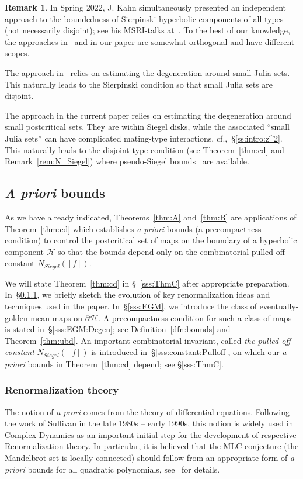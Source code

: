 \documentclass[11pt, reqno]{amsart}
\numberwithin{equation}{section}
\theoremstyle{plain}
\theoremstyle{theorem}
\theoremstyle{plain}
\theoremstyle{definition}
\newtheorem{rmk}[theorem]{Remark}
\numberwithin{figure}{section}
\begin{document}
\begin{rmk}
\label{rem:Khan:MSRI}
In Spring 2022, J. Kahn simultaneously presented an independent approach to the boundedness of Sierpinski hyperbolic components of all types (not necessarily disjoint); see his MSRI-talks at~\cite{Kah22}. To the best of our knowledge, the approaches in~\cite{Kah22} and in our paper are somewhat orthogonal and have different scopes. 


The approach in~\cite{Kah22} relies on estimating the degeneration around small Julia sets. This naturally leads to the Sierpinski condition so that small Julia sets are disjoint.

The approach in the current paper relies on estimating the degeneration around small postcritical sets. They are within Siegel disks, while the associated ``small Julia sets'' can have complicated mating-type interactions, cf.,~\S\ref{ss:intro:z^2}. This naturally leads to the disjoint-type condition (see Theorem~\ref{thm:cd} and Remark~\ref{rem:N_Siegel}) where pseudo-Siegel bounds~\cite{DL22,DLL25} are available.
\end{rmk}




\subsection{\emph{A priori} bounds}\label{ss:a priori bounds} As we have already indicated, Theorems~\ref{thm:A} and~\ref{thm:B} are applications of Theorem~\ref{thm:cd} which establishes \emph{a priori} bounds (a precompactness condition) to control the postcritical set of maps on the boundary of a hyperbolic component $ \mathcal H$ so that the bounds depend only on the combinatorial pulled-off constant $N_{Siegel}([f])$.

We will state Theorem~\ref{thm:cd} in \S~\ref{sss:ThmC} after appropriate preparation. In~\S\ref{sss:RenormTheory}, we briefly sketch the evolution of key renormalization ideas and techniques used in the paper. In~\S\ref{sss:EGM}, we introduce the class of eventually-golden-mean maps on $\partial \mathcal H$. A precompactness condition for such a class of maps is stated in~\S\ref{sss:EGM:Degen}; see Definition~\ref{dfn:bounds} and Theorem~\ref{thm:ubd}. An important combinatorial invariant, called {\em the pulled-off constant} $N_{Siegel}([f])$ is introduced in~\S\ref{sss:constant:Pulloff}, on which our \emph{a priori} bounds in Theorem~\ref{thm:cd} depend; see \S\ref{sss:ThmC}.

\subsubsection{Renormalization theory}\label{sss:RenormTheory}
The notion of \emph{a prori} comes from the theory of differential equations. Following the work of Sullivan in the late 1980s -- early 1990s, this notion is widely used in Complex Dynamics as an important initial step for the development of respective Renormalization theory. In particular, it is believed that the MLC conjecture (the Mandelbrot set is locally connected) should follow from an appropriate form of \emph{a priori} bounds for all quadratic polynomials, see~\cite[\S1.5]{DL22} for details. 
\end{document}
